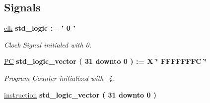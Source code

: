 \subsection*{Signals}
 \begin{DoxyCompactItemize}
\item 
\hypertarget{class_simple_r_i_s_c_1_1main_a5857e39b3d56429139fcaba0533d3961}{\hyperlink{class_simple_r_i_s_c_1_1main_a5857e39b3d56429139fcaba0533d3961}{clk} {\bfseries \textcolor{comment}{std\-\_\-logic}\textcolor{vhdlchar}{ }\textcolor{vhdlchar}{ }\textcolor{vhdlchar}{\-:}\textcolor{vhdlchar}{=}\textcolor{vhdlchar}{ }\textcolor{vhdlchar}{'}\textcolor{vhdlchar}{ } \textcolor{vhdldigit}{0} \textcolor{vhdlchar}{ }\textcolor{vhdlchar}{'}\textcolor{vhdlchar}{ }} }\label{class_simple_r_i_s_c_1_1main_a5857e39b3d56429139fcaba0533d3961}

\begin{DoxyCompactList}\small\item\em Clock Signal initialed with 0. \end{DoxyCompactList}\item 
\hypertarget{class_simple_r_i_s_c_1_1main_aa8e9caeeae56e2652cba742bdb6e6e31}{\hyperlink{class_simple_r_i_s_c_1_1main_aa8e9caeeae56e2652cba742bdb6e6e31}{P\-C} {\bfseries \textcolor{comment}{std\-\_\-logic\-\_\-vector}\textcolor{vhdlchar}{ }\textcolor{vhdlchar}{(}\textcolor{vhdlchar}{ } \textcolor{vhdldigit}{31} \textcolor{vhdlchar}{ }\textcolor{vhdlchar}{ }\textcolor{vhdlchar}{ }\textcolor{vhdlkeyword}{downto}\textcolor{vhdlchar}{ }\textcolor{vhdlchar}{ }\textcolor{vhdlchar}{ } \textcolor{vhdldigit}{0} \textcolor{vhdlchar}{ }\textcolor{vhdlchar}{)}\textcolor{vhdlchar}{ }\textcolor{vhdlchar}{ }\textcolor{vhdlchar}{\-:}\textcolor{vhdlchar}{=}\textcolor{vhdlchar}{ }\textcolor{vhdlchar}{X}\textcolor{vhdlchar}{ }\textcolor{keyword}{\char`\"{} F\-F\-F\-F\-F\-F\-F\-C \char`\"{}}\textcolor{vhdlchar}{ }} }\label{class_simple_r_i_s_c_1_1main_aa8e9caeeae56e2652cba742bdb6e6e31}

\begin{DoxyCompactList}\small\item\em Program Counter initialized with -\/4. \end{DoxyCompactList}\item 
\hypertarget{class_simple_r_i_s_c_1_1main_a0a8debbc78ed5d82965045d4eee97461}{\hyperlink{class_simple_r_i_s_c_1_1main_a0a8debbc78ed5d82965045d4eee97461}{instruction} {\bfseries \textcolor{comment}{std\-\_\-logic\-\_\-vector}\textcolor{vhdlchar}{ }\textcolor{vhdlchar}{(}\textcolor{vhdlchar}{ } \textcolor{vhdldigit}{31} \textcolor{vhdlchar}{ }\textcolor{vhdlchar}{ }\textcolor{vhdlchar}{ }\textcolor{vhdlkeyword}{downto}\textcolor{vhdlchar}{ }\textcolor{vhdlchar}{ }\textcolor{vhdlchar}{ } \textcolor{vhdldigit}{0} \textcolor{vhdlchar}{ }\textcolor{vhdlchar}{)}\textcolor{vhdlchar}{ }} }\label{class_simple_r_i_s_c_1_1main_a0a8debbc78ed5d82965045d4eee97461}


\end{DoxyCompactItemize}
